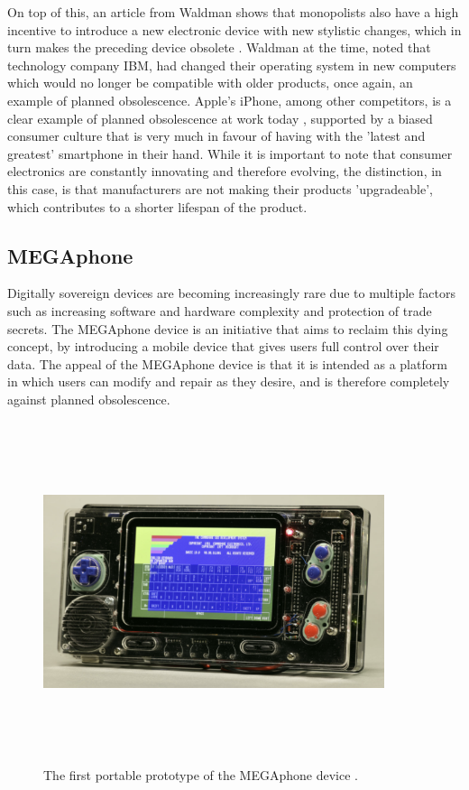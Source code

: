 On top of this, an article from Waldman shows that monopolists also have a high incentive to introduce a new electronic device with new stylistic changes, which in turn makes the preceding device obsolete \cite{obsolescence2}.
Waldman at the time, noted that technology company IBM, had changed their operating system in new computers which would no longer be compatible with older products, once again, an example of planned obsolescence.
Apple's iPhone, among other competitors, is a clear example of planned obsolescence at work today \cite{hugh} \cite{jerry}, supported by a biased consumer culture that is very much in favour of having with the 'latest and greatest' smartphone in their hand.
While it is important to note that consumer electronics are constantly innovating and therefore evolving, the distinction, in this case, is that manufacturers are not making their products 'upgradeable', which contributes to a shorter lifespan of the product.

\subsection{MEGAphone}

Digitally sovereign devices are becoming increasingly rare due to multiple factors such as increasing software and hardware complexity and protection of trade secrets.
The MEGAphone device is an initiative that aims to reclaim this dying concept, by introducing a mobile device that gives users full control over their data.
The appeal of the MEGAphone device is that it is intended as a platform in which users can modify and repair as they desire, and is therefore completely against planned obsolescence.

\begin{figure} [h]
    \centering
    \includegraphics[width=10cm,height=10cm,keepaspectratio]{Figures/megaphone_concept.png}
    \caption{The first portable prototype of the MEGAphone device \cite{mega65}.}
    \label{fig:MEGAphoneConcept}
\end{figure}

